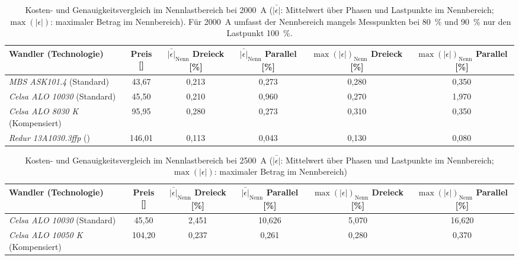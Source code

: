 \begin{table}[H]
    \centering
    \caption{Kosten- und Genauigkeitsvergleich im Nennlastbereich bei \SI{2000}{A} (\(\bar{|\epsilon|}\): Mittelwert über Phasen und Lastpunkte im Nennbereich; \(\max(|\epsilon|)\): maximaler Betrag im Nennbereich). Für \SI{2000}{A} umfasst der Nennbereich mangels Messpunkten bei \SI{80}{\percent} und \SI{90}{\percent} nur den Lastpunkt \SI{100}{\percent}.}
    \label{tab:oeko_2000A_kosten_genauigkeit}
    \small
    \setlength{\tabcolsep}{5pt}
    \begin{tabular}{@{}l S[table-format=3.2] S[table-format=2.3] S[table-format=2.3] S[table-format=2.3] S[table-format=2.3]@{}}
        \toprule
        \textbf{Wandler (Technologie)} & {\textbf{Preis [\text{\euro}]}} & {\textbf{\(\bar{|\epsilon|}_{\mathrm{Nenn}}\) Dreieck [\%]}} & {\textbf{\(\bar{|\epsilon|}_{\mathrm{Nenn}}\) Parallel [\%]}} & {\textbf{\(\max(|\epsilon|)_{\mathrm{Nenn}}\) Dreieck [\%]}} & {\textbf{\(\max(|\epsilon|)_{\mathrm{Nenn}}\) Parallel [\%]}} \\
        \midrule
        \textit{MBS ASK101.4} (Standard) & 43,67 & 0,213 & 0,273 & 0,280 & 0,350 \\
        \textit{Celsa ALO 10030} (Standard) & 45,50 & 0,210 & 0,960 & 0,270 & 1,970 \\
        \textit{Celsa ALO 8030 K} (Kompensiert) & 95,95 & 0,280 & 0,273 & 0,310 & 0,350 \\
        \textit{Redur 13A1030.3ffp} () & 146,01 & 0,113 & 0,043 & 0,130 & 0,080 \\
        \bottomrule
    \end{tabular}
\end{table}

\begin{table}[H]
    \centering
    \caption{Kosten- und Genauigkeitsvergleich im Nennlastbereich bei \SI{2500}{A} (\(\bar{|\epsilon|}\): Mittelwert über Phasen und Lastpunkte im Nennbereich; \(\max(|\epsilon|)\): maximaler Betrag im Nennbereich)}
    \label{tab:oeko_2500A_kosten_genauigkeit}
    \small
    \setlength{\tabcolsep}{5pt}
    \begin{tabular}{@{}l S[table-format=3.2] S[table-format=2.3] S[table-format=2.3] S[table-format=2.3] S[table-format=2.3]@{}}
        \toprule
        \textbf{Wandler (Technologie)} & {\textbf{Preis [\text{\euro}]}} & {\textbf{\(\bar{|\epsilon|}_{\mathrm{Nenn}}\) Dreieck [\%]}} & {\textbf{\(\bar{|\epsilon|}_{\mathrm{Nenn}}\) Parallel [\%]}} & {\textbf{\(\max(|\epsilon|)_{\mathrm{Nenn}}\) Dreieck [\%]}} & {\textbf{\(\max(|\epsilon|)_{\mathrm{Nenn}}\) Parallel [\%]}} \\
        \midrule
        \textit{Celsa ALO 10030} (Standard) & 45,50 & 2,451 & 10,626 & 5,070 & 16,620 \\
        \textit{Celsa ALO 10050 K} (Kompensiert) & 104,20 & 0,237 & 0,261 & 0,280 & 0,370 \\
        \bottomrule
    \end{tabular}
\end{table}

